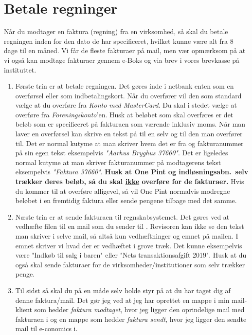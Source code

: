 \section{Betale regninger}
Når du modtager en faktura (regning) fra en virksomhed, så skal du betale regningen inden for den dato de har specificeret, hvilket kunne være alt fra 8 dage til en måned. Vi får de fleste fakturaer på mail, men vær opmærksom på at vi også kan modtage fakturaer gennem e-Boks og via brev i vores brevkasse på instituttet. 
\begin{enumerate}
    \item Første trin er at betale regningen. Det gøres inde i netbank enten som en
        overførsel eller som indbetalingskort. Når du overfører vil den som standard
        vælge at du overføre fra \textit{Konto med MasterCard}. Du skal i stedet vælge
        at overføre fra \textit{Foreningskonto}'en. Husk at beløbet som skal overføres
        er det beløb som er specificeret på fakturaen som værende inklusiv moms. Når man
        laver en overførsel kan skrive en tekst på til en selv og til den man overfører
        til. Det er normal kutyme at man skriver hvem det er fra og fakturanummer på sin
        egen tekst eksempelvis \textit{"Aarhus Bryghus 37660"}. Det er ligeledes normal
        kutyme at man skriver fakturanummer på modtagerens tekst eksempelvis
        \textit{"Faktura 37660"}. \textbf{Husk at One Pint og indløsningsabn.~selv
        trækker deres beløb, så du skal \underline{ikke} overføre for de fakturaer.} Hvis du kommer til at overføre alligevel, så vil One Pint normalvis modregne beløbet i en fremtidig faktura eller sende pengene tilbage med det samme.
    \item Næste trin er at sende fakturaen til regnskabsystemet. Det gøres ved at vedhæfte filen til en mail som du sender til . Revisoren kan ikke se den tekst man skriver i selve mail, så altså kun vedhæftninger og emnet på mailen. I emnet skriver vi hvad der er vedhæftet i grove træk. Det kunne eksempelvis være "Indkøb til salg i baren" eller "Nets transaktionsafgift 2019". Husk at du også skal sende fakturaer for de virksomheder/institutioner som selv trækker penge.
    \item Til sidst så skal du på en måde selv holde styr på at du har taget dig af denne faktura/mail. Det gør jeg ved at jeg har oprettet en mappe i min mail-klient som hedder \textit{faktura modtaget}, hvor jeg ligger den oprindelige mail med fakturaen i og en mappe som hedder \textit{faktura sendt}, hvor jeg ligger den sendte mail til e-conomics i.
\end{enumerate}


